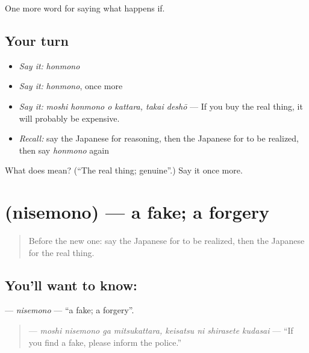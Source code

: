 \begin{grammarlens}[title={What you've built}]
One more word for saying what happens if.
\end{grammarlens}

\subsection*{Your turn}
\begin{itemize}
\raggedright
  \item \emph{Say it:} \emph{honmono}
  \item \emph{Say it:} \emph{honmono}, once more
  \item \emph{Say it:} \emph{moshi honmono o kattara, takai deshō} — If you buy the real thing, it will probably be expensive.
  \item \emph{Recall:} say the Japanese for reasoning, then the Japanese for to be realized, then say \emph{honmono} again
\end{itemize}

\begin{tcolorbox}[breakable,colback=teal!4,colframe=teal!35!black,title={Before you move on}]
What does  mean? (\textquotedblleft{}The real thing; genuine\textquotedblright{}.) Say it once more.
\end{tcolorbox}
\section[\texorpdfstring{\ja{にせもの} (nisemono)}{にせもの (nisemono)}]{ (nisemono) — a fake; a forgery}

\label{lesson:JA-C525-nisemono}



\begin{quote}
Before the new one: say the Japanese for to be realized, then the Japanese for the real thing.
\end{quote}

\subsection*{You'll want to know: }
\textbf{} — \emph{nisemono} — \textquotedblleft{}a fake; a forgery\textquotedblright{}.

\begin{quote}
\textbf{    } — \emph{moshi nisemono ga mitsukattara, keisatsu ni shirasete kudasai} — \textquotedblleft{}If you find a fake, please inform the police.\textquotedblright{}
\end{quote}

